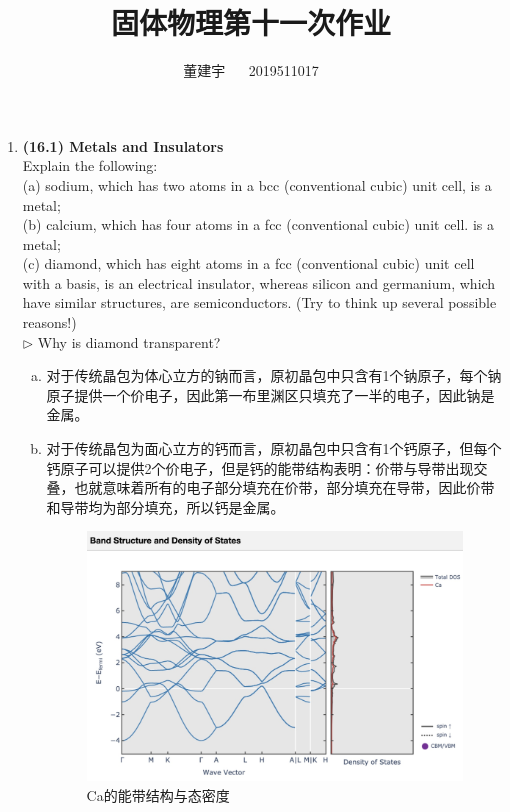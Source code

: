 \documentclass[reqno,a4paper,12pt]{amsart}
\title{固体物理第十一次作业}
\author{董建宇 ~~ 2019511017}
\begin{document}
\maketitle

\begin{enumerate}[1.]

\item \textbf{(16.1) Metals and Insulators} \\
Explain the following: \\
(a) sodium, which has two atoms in a bcc (conventional cubic) unit cell, is a metal; \\
(b) calcium, which has four atoms in a fcc (conventional cubic) unit cell. is a metal; \\
(c) diamond, which has eight atoms in a fcc (conventional cubic) unit cell with a basis, is an electrical insulator, whereas silicon and germanium, which have similar structures, are semiconductors. (Try to think up several possible reasons!) \\
$\triangleright$ Why is diamond transparent? 
\begin{tcolorbox}[breakable, colback = black!5!white, colframe = black]
\begin{enumerate}[(a)]
\item 对于传统晶包为体心立方的钠而言，原初晶包中只含有1个钠原子，每个钠原子提供一个价电子，因此第一布里渊区只填充了一半的电子，因此钠是金属。

\item 对于传统晶包为面心立方的钙而言，原初晶包中只含有1个钙原子，但每个钙原子可以提供2个价电子，但是钙的能带结构表明：价带与导带出现交叠，也就意味着所有的电子部分填充在价带，部分填充在导带，因此价带和导带均为部分填充，所以钙是金属。 
\begin{figure}[H]
	\centering
	\includegraphics[width = 120mm]{Ca-band-structure.jpeg}
	\caption{Ca的能带结构与态密度}
\end{figure}


\end{enumerate}
\end{tcolorbox}
\end{enumerate}
\end{document}
